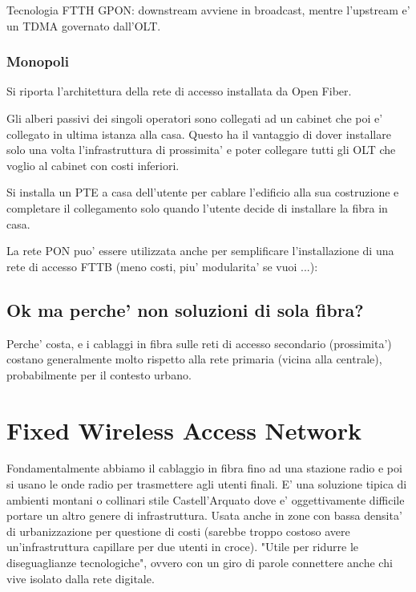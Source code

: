 Tecnologia FTTH GPON: downstream avviene in broadcast, mentre l'upstream e' un TDMA governato dall'OLT.


\subsubsection{Monopoli}

Si riporta l'architettura della rete di accesso installata da Open Fiber.

Gli alberi passivi dei singoli operatori sono collegati ad un cabinet che poi e' collegato in ultima istanza alla casa. Questo ha il vantaggio di dover installare solo una volta l'infrastruttura di prossimita' e poter collegare tutti gli OLT che voglio al cabinet con costi inferiori.

Si installa un PTE a casa dell'utente per cablare l'edificio alla sua costruzione e completare il collegamento solo quando l'utente decide di installare la fibra in casa.


La rete PON puo' essere utilizzata anche per semplificare l'installazione di una rete di accesso FTTB (meno costi, piu' modularita' se vuoi ...):


\subsection{Ok ma perche' non soluzioni di sola fibra?}

Perche' costa, e i cablaggi in fibra sulle reti di accesso secondario (prossimita') costano generalmente molto rispetto alla rete primaria (vicina alla centrale), probabilmente per il contesto urbano.

\section{Fixed Wireless Access Network}

Fondamentalmente abbiamo il cablaggio in fibra fino ad una stazione radio e poi si usano le onde radio per trasmettere agli utenti finali. E' una soluzione tipica di ambienti montani o collinari stile Castell'Arquato dove e' oggettivamente difficile portare un altro genere di infrastruttura.
Usata anche in zone con bassa densita' di urbanizzazione per questione di costi (sarebbe troppo costoso avere un'infrastruttura capillare per due utenti in croce).
"Utile per ridurre le diseguaglianze tecnologiche", ovvero con un giro di parole connettere anche chi vive isolato dalla rete digitale.

